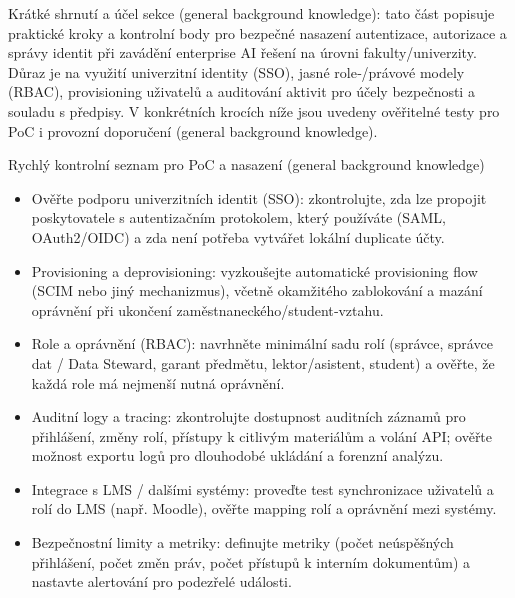Krátké shrnutí a účel sekce (general background knowledge): tato část popisuje praktické kroky a kontrolní body pro bezpečné nasazení autentizace, autorizace a správy identit při zavádění enterprise AI řešení na úrovni fakulty/univerzity. Důraz je na využití univerzitní identity (SSO), jasné role‑/právové modely (RBAC), provisioning uživatelů a auditování aktivit pro účely bezpečnosti a souladu s předpisy. V konkrétních krocích níže jsou uvedeny ověřitelné testy pro PoC i provozní doporučení (general background knowledge).

Rychlý kontrolní seznam pro PoC a nasazení (general background knowledge)
\begin{itemize}
  \item Ověřte podporu univerzitních identit (SSO): zkontrolujte, zda lze propojit poskytovatele s autentizačním protokolem, který používáte (SAML, OAuth2/OIDC) a zda není potřeba vytvářet lokální duplicate účty.
  \item Provisioning a deprovisioning: vyzkoušejte automatické provisioning flow (SCIM nebo jiný mechanizmus), včetně okamžitého zablokování a mazání oprávnění při ukončení zaměstnaneckého/student‑vztahu.
  \item Role a oprávnění (RBAC): navrhněte minimální sadu rolí (správce, správce dat / Data Steward, garant předmětu, lektor/asistent, student) a ověřte, že každá role má nejmenší nutná oprávnění.
  \item Auditní logy a tracing: zkontrolujte dostupnost auditních záznamů pro přihlášení, změny rolí, přístupy k citlivým materiálům a volání API; ověřte možnost exportu logů pro dlouhodobé ukládání a forenzní analýzu.
  \item Integrace s LMS / dalšími systémy: proveďte test synchronizace uživatelů a rolí do LMS (např. Moodle), ověřte mapping rolí a oprávnění mezi systémy.
  \item Bezpečnostní limity a metriky: definujte metriky (počet neúspěšných přihlášení, počet změn práv, počet přístupů k interním dokumentům) a nastavte alertování pro podezřelé události.
\end{itemize}

